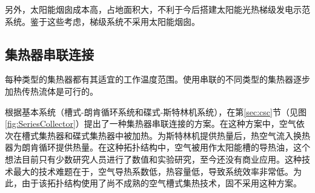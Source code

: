 另外，太阳能烟囱成本高，占地面积大，不利于今后搭建太阳能光热梯级发电示范系统。鉴于这些考虑，梯级系统不采用太阳能烟囱。

\subsection{集热器串联连接}
\label{sec:seriesConnection}
每种类型的集热器都有其适宜的工作温度范围。使用串联的不同类型的集热器逐步加热传热流体是可行的。

根据基本系统（槽式-朗肯循环系统和碟式-斯特林机系统），在第\ref{sec:csc}节（见图\ref{fig:SeriesCollector}）提出了一种集热器串联连接的方案。在这种方案中，空气依次在槽式集热器和碟式集热器中被加热。为斯特林机提供热量后，热空气流入换热器为朗肯循环提供热量。在这种拓扑结构中，空气被用作太阳能槽的导热油，这个想法目前只有少数研究人员进行了数值和实验研究，至今还没有商业应用\cite{Good2015,Good2016}。这种技术最大的技术难题在于，空气导热系数低，热容量低，导致系统效率非常低。为此，由于该拓扑结构使用了尚不成熟的空气槽式集热技术，固不采用这种方案。

